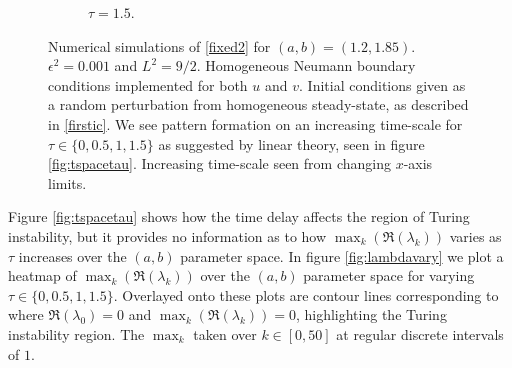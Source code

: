 \begin{figure}[H]
\begin{subfigure}[b]{0.45\textwidth}
        \caption{$\tau=1.5$.}
        \label{}
    \end{subfigure}
    \caption{Numerical simulations of \eqref{fixed2} for $(a,b)=(1.2,1.85)$. $\epsilon^2=0.001$ and $L^2=9/2$. Homogeneous Neumann boundary conditions implemented for both $u$ and $v$. Initial conditions given as a random perturbation from homogeneous steady-state, as described in \eqref{firstic}. We see pattern formation on an increasing time-scale for $\tau\in\{0,0.5,1,1.5\}$ as suggested by linear theory, seen in figure \ref{fig:tspacetau}. Increasing time-scale seen from changing $x$-axis limits.}
    \label{fig:testturing3}
\end{figure}

Figure \ref{fig:tspacetau} shows how the time delay affects the region of Turing instability, but it provides no information as to how $\max_k(\Re(\lambda_k))$ varies as $\tau$ increases over the $(a,b)$ parameter space. In figure \ref{fig:lambdavary} we plot a heatmap of $\max_k(\Re(\lambda_k))$ over the $(a,b)$ parameter space for varying $\tau\in\{0,0.5,1,1.5\}$. Overlayed onto these plots are contour lines corresponding to where $\Re(\lambda_0)=0$ and $\max_k(\Re(\lambda_k))=0$,
highlighting the Turing instability region. The $\max_k$ taken over $k\in[0,50]$ at regular discrete intervals of $1$.
